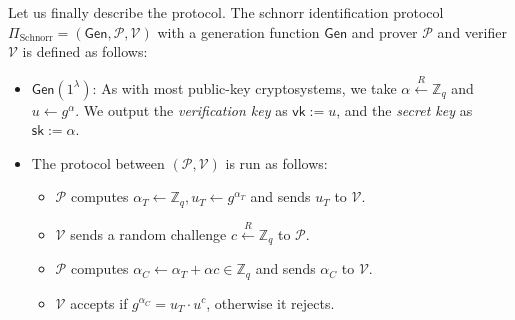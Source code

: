 \documentclass[../lecture-notes.tex]{subfiles}
\begin{document}
Let us finally describe the protocol. The schnorr identification protocol $\Pi_{\text{Schnorr}} = (\mathsf{Gen}, \mathcal{P}, \mathcal{V})$ with a generation function $\mathsf{Gen}$ and prover $\mathcal{P}$ and verifier $\mathcal{V}$ is defined as follows:
\begin{itemize}
    \item $\mathsf{Gen}(1^{\lambda})$: As with most public-key cryptosystems, we take $\alpha \xleftarrow{R} \mathbb{Z}_q$ and $u \gets g^{\alpha}$. We output the \textit{verification key} as $\mathsf{vk} := u$, and the \textit{secret key} as $\mathsf{sk} := \alpha$.
    \item The protocol between $(\mathcal{P},\mathcal{V})$ is run as follows:
    \begin{itemize}
        \item $\mathcal{P}$ computes $\alpha_T \gets \mathbb{Z}_q, u_T \gets g^{\alpha_T}$ and sends $u_T$ to $\mathcal{V}$.
        \item $\mathcal{V}$ sends a random challenge $c \xleftarrow{R} \mathbb{Z}_q$ to $\mathcal{P}$.
        \item $\mathcal{P}$ computes $\alpha_C \gets \alpha_T + \alpha c \in \mathbb{Z}_q$ and sends $\alpha_C$ to $\mathcal{V}$.
        \item $\mathcal{V}$ accepts if $g^{\alpha_C} = u_T \cdot u^c$, otherwise it rejects.
    \end{itemize}
\end{itemize}
\end{document}
